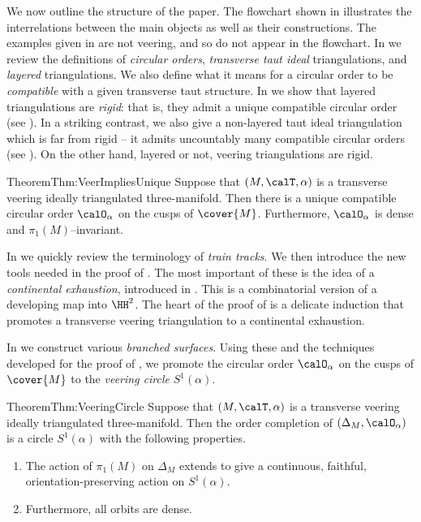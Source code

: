 \documentclass[12pt]{amsart}
\begin{document}
We now outline the structure of the paper.  The flowchart shown in  illustrates the interrelations between the main objects as well as their constructions.  The examples given in  are not veering, and so do not appear in the flowchart.
In  we review the definitions of \emph{circular orders}, \emph{transverse taut ideal} triangulations, and \emph{layered} triangulations.  We also define what it means for a circular order to be \emph{compatible} with a given transverse taut structure.  
In  we show that layered triangulations are \emph{rigid}: that is, they admit a unique compatible circular order (see ).  
In a striking contrast, we also give a non-layered taut ideal triangulation which is far from rigid -- it admits uncountably many compatible circular orders (see ).  
On the other hand, layered or not, veering triangulations are rigid. 

\begin{restate}{Theorem}{Thm:VeerImpliesUnique}
Suppose that $(M, \calT, \alpha)$ is a transverse veering ideally triangulated three-manifold.  
Then there is a unique compatible circular order $\calO_\alpha$ on the cusps of $\cover{M}$.  Furthermore, $\calO_\alpha$ is dense and $\pi_1(M)$--invariant.
\end{restate}







\noindent
In  we quickly review the terminology of \emph{train tracks}.  We then introduce the new tools needed in the proof of .  The most important of these is the idea of a \emph{continental exhaustion}, introduced in .  This is a combinatorial version of a developing map into $\HH^2$.   The heart of the proof of  is a delicate induction that promotes a transverse veering triangulation to a continental exhaustion.  

In  we construct various \emph{branched surfaces}.  Using these and the techniques developed for the proof of , we promote the circular order $\calO_\alpha$ on the cusps of $\cover{M}$ to the \emph{veering circle} $S^1(\alpha)$.  

\begin{restate}{Theorem}{Thm:VeeringCircle}
Suppose that $(M, \calT, \alpha)$ is a transverse veering ideally triangulated three-manifold.  Then the order completion of $(\Delta_M, \calO_\alpha)$ is a circle $S^1(\alpha)$ with the following properties.
\begin{enumerate}
\item 
The action of $\pi_1(M)$ on $\Delta_M$ extends to give a continuous, faithful, orientation-preserving action on  $S^1(\alpha)$.  
\item 
Furthermore, all orbits are dense.
\end{enumerate}
\end{restate}
\end{document}
